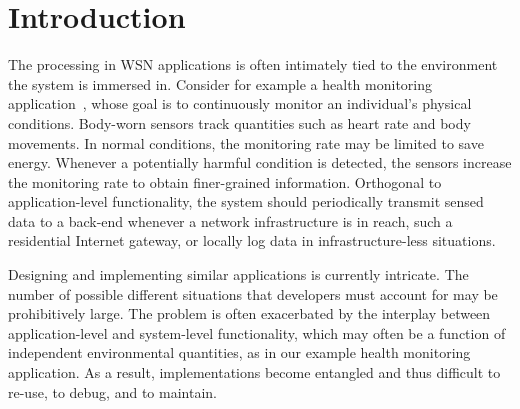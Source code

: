 \section{Introduction}
The processing in WSN applications is often intimately tied to the
environment the system is immersed in. Consider for example a health
monitoring application~\cite{ko10wireless}, whose goal is to
continuously monitor an individual's physical conditions. Body-worn
sensors track quantities such as heart rate and body movements. In
normal conditions, the monitoring rate may be limited to save
energy. Whenever a potentially harmful condition is detected, the
sensors increase the monitoring rate to obtain finer-grained
information. Orthogonal to application-level functionality, the system
should periodically transmit sensed data to a back-end whenever a
network infrastructure is in reach, such a residential Internet
gateway, or locally log data in infrastructure-less situations.

 
Designing and implementing similar applications is currently
intricate. The number of possible different situations that developers
must account for may be prohibitively large. The problem is often
exacerbated by the interplay between application-level and
system-level functionality, which may often be a function of
independent environmental quantities, as in our example health
monitoring application. As a result, implementations become entangled
and thus difficult to re-use, to debug, and to maintain.



